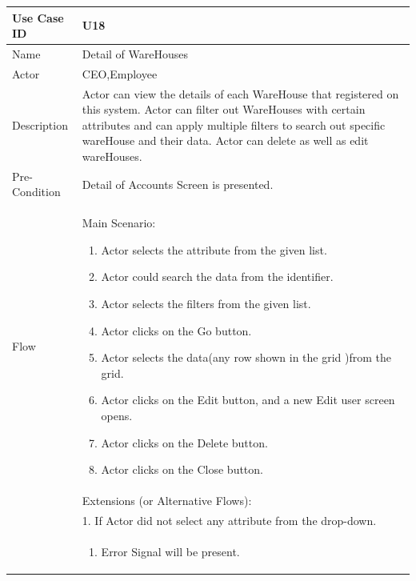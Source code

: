 \documentclass[12pt,a4paper]{report}
\begin{document}
\begin{tabular}{ | m{3cm} | m{12cm}| } \hline

Use Case ID & U18  \\\hline

Name  	    & Detail of WareHouses  \\ \hline

Actor     	& CEO,Employee\\ \hline

Description &  Actor can view the details of each WareHouse that registered on this system. Actor can filter out WareHouses with certain attributes and can apply multiple filters to search out specific wareHouse and  their data. Actor can delete as well as edit wareHouses.\\ \hline

Pre-Condition &  Detail of Accounts Screen is presented. \\ \hline

Flow       & Main Scenario:

\begin{enumerate}
\item  Actor selects the attribute from the given list. 
\item  Actor could search the data from the identifier.
\item  Actor selects the filters from the given list.
\item  Actor clicks on the Go button.
\item  Actor selects the data(any row shown in the grid )from the grid. 
\item  Actor clicks on the Edit button, and a new Edit user screen opens.
\item  Actor clicks on the Delete button.
\item  Actor clicks on the Close button.


\end{enumerate}\\ 

&Extensions (or Alternative Flows):\\

& 1. If Actor did not select any attribute from the drop-down. \\
& \begin{enumerate}
		\item Error Signal will be present.
	\end{enumerate}
\\ 


\end{tabular}
\end{document}
